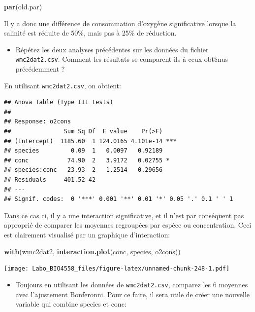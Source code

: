 \documentclass[12pt,]{book}
\newenvironment{Shaded}{\begin{snugshade}}{\end{snugshade}}
\newcommand{\KeywordTok}[1]{\textcolor[rgb]{0.13,0.29,0.53}{\textbf{#1}}}
\newcommand{\NormalTok}[1]{#1}
\providecommand{\tightlist}{%
  \setlength{\itemsep}{0pt}\setlength{\parskip}{0pt}}
\begin{document}
\begin{Shaded}
\begin{Highlighting}[]
\KeywordTok{par}\NormalTok{(old.par)}
\end{Highlighting}
\end{Shaded}

Il y a donc une différence de consommation d'oxygène significative lorsque la salinité est réduite de 50\%, mais pas à 25\% de réduction.

\begin{itemize}
\tightlist
\item
  Répétez les deux analyses précédentes sur les données du fichier \texttt{wmc2dat2.csv}. Comment les résultats se comparent-ils à ceux obt\$nus précédemment ?
\end{itemize}

En utilisant \texttt{wmc2dat2.csv}, on obtient:

\begin{verbatim}
## Anova Table (Type III tests)
## 
## Response: o2cons
##               Sum Sq Df  F value    Pr(>F)    
## (Intercept)  1185.60  1 124.0165 4.101e-14 ***
## species         0.09  1   0.0097   0.92189    
## conc           74.90  2   3.9172   0.02755 *  
## species:conc   23.93  2   1.2514   0.29656    
## Residuals     401.52 42                       
## ---
## Signif. codes:  0 '***' 0.001 '**' 0.01 '*' 0.05 '.' 0.1 ' ' 1
\end{verbatim}

Dans ce cas ci, il y a une interaction significative, et il n'est par conséquent pas approprié de comparer les moyennes regroupées par espèce ou concentration. Ceci est clairement visualisé par un graphique d'interaction:

\begin{Shaded}
\begin{Highlighting}[]
\KeywordTok{with}\NormalTok{(wmc2dat2, }\KeywordTok{interaction.plot}\NormalTok{(conc, species, o2cons))}
\end{Highlighting}
\end{Shaded}

\texttt{[image: Labo\_BIO4558\_files/figure-latex/unnamed-chunk-248-1.pdf]}

\begin{itemize}
\tightlist
\item
  Toujours en utilisant les données de \texttt{wmc2dat2.csv}, comparez les 6 moyennes avec l'ajustement Bonferonni. Pour ce faire, il sera utile de créer une nouvelle variable qui combine species et conc:
\end{itemize}
\end{document}
